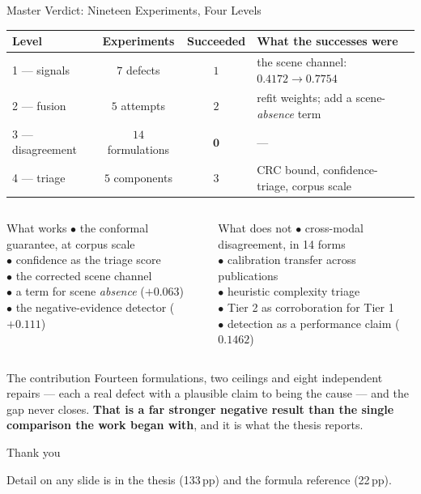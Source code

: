 \documentclass[aspectratio=169,11pt]{beamer}
\begin{document}
\begin{frame}{Master Verdict: Nineteen Experiments, Four Levels}
\scriptsize
\begin{center}
\begin{tabular}{@{}l c c l@{}}
\toprule
\textbf{Level} & \textbf{Experiments} & \textbf{Succeeded} & \textbf{What the successes were} \\
\midrule
1 --- signals & $7$ defects & $1$ & the scene channel: $0.4172 \to 0.7754$ \\
2 --- fusion & $5$ attempts & $2$ & refit weights; add a scene-\emph{absence} term \\
3 --- disagreement & $14$ formulations & $\mathbf{0}$ & --- \\
4 --- triage & $5$ components & $3$ & CRC bound, confidence-triage, corpus scale \\
\bottomrule
\end{tabular}
\end{center}
\vspace{2mm}
\begin{columns}[T]
\begin{exampleblock}{\small What works}
\scriptsize
$\bullet$ the conformal guarantee, at corpus scale \\
$\bullet$ confidence as the triage score \\
$\bullet$ the corrected scene channel \\
$\bullet$ a term for scene \emph{absence} ($+0.063$) \\
$\bullet$ the negative-evidence detector ($+0.111$)
\end{exampleblock}

\begin{alertblock}{\small What does not}
\scriptsize
$\bullet$ cross-modal disagreement, in 14 forms \\
$\bullet$ calibration transfer across publications \\
$\bullet$ heuristic complexity triage \\
$\bullet$ Tier 2 as corroboration for Tier 1 \\
$\bullet$ detection as a performance claim ($0.1462$)
\end{alertblock}
\end{columns}
\vspace{1mm}
\begin{alertblock}{\small The contribution}
\footnotesize Fourteen formulations, two ceilings and eight independent repairs --- each a real defect with a plausible claim to being the cause --- and the gap never closes. \textbf{That is a far stronger negative result than the single comparison the work began with}, and it is what the thesis reports.
\end{alertblock}
\end{frame}

\begin{frame}[standout]
Thank you
\vspace{4mm}

{\normalsize Detail on any slide is in the thesis (133\,pp) and the formula reference (22\,pp).}
\end{frame}
\end{document}
